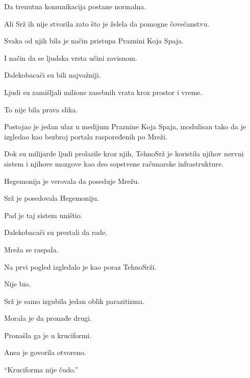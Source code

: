 Da trenutna komunikacija postane normalna.

\bigskip

Ali Srž ih nije stvorila zato što je želela da pomogne čovečanstvu.

\bigskip

Svaka od njih bila je način pristupa Praznini Koja Spaja.

\bigskip

I način da se ljudska vrsta učini zavisnom.

\bigskip

Dalekobacači su bili najvažniji.

\bigskip

Ljudi su zamišljali milione zasebnih vrata kroz prostor i vreme.

To nije bila prava slika.

\bigskip

Postojao je jedan ulaz u medijum Praznine Koja Spaja, modulisan tako da je izgledao kao bezbroj portala raspoređenih po Mreži.

\bigskip

Dok su milijarde ljudi prolazile kroz njih, TehnoSrž je koristila njihov nervni sistem i njihove mozgove kao deo sopstvene računarske infrastrukture.

\bigskip

Hegemonija je verovala da poseduje Mrežu.

\bigskip

Srž je posedovala Hegemoniju.

\bigskip

Pad je taj sistem uništio.

Dalekobacači su prestali da rade.

Mreža se raspala.

\bigskip

Na prvi pogled izgledalo je kao poraz TehnoSrži.

\bigskip

Nije bio.

\bigskip

Srž je samo izgubila jedan oblik parazitizma.

Morala je da pronađe drugi.

\bigskip

Pronašla ga je u kruciformi.

\bigskip

Anea je govorila otvoreno.

``Kruciforma nije čudo.''

\bigskip

